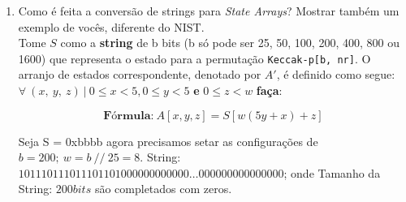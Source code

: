 \documentclass[12pt, a4paper]{article}
\begin{document}
\begin{enumerate}
\begin{enumerate}
\item Como é feita a conversão de strings para \textit{State Arrays}? Mostrar
também um exemplo de vocês, diferente do NIST.\\

Tome $S$ como a \textbf{string} de b bits (b só pode ser 25, 50, 100, 200, 400,
800 ou 1600) que representa o estado para a permutação \verb|Keccak-p[b, nr]|.
O arranjo de estados correspondente, denotado por $A'$, é definido como segue:
$\forall\ (x,\ y,\ z)\ |\ 0 \le x < 5, 0 \le y < 5$ \textbf{e} $0 \le z < w$
\textbf{faça}:

$$\textbf{Fórmula:}\ A[x, y, z] = S[w(5y + x) + z]$$

Seja S = 0xbbbb agora precisamos setar as configurações de $b = 200;\ w = b\
//\ 25 = 8$. String: $101110111011101101000000000000\ldots000000000000000$; onde
Tamanho da String: $200 bits$ são completados com zeros.\\


\end{enumerate}
\end{enumerate}
\end{document}
